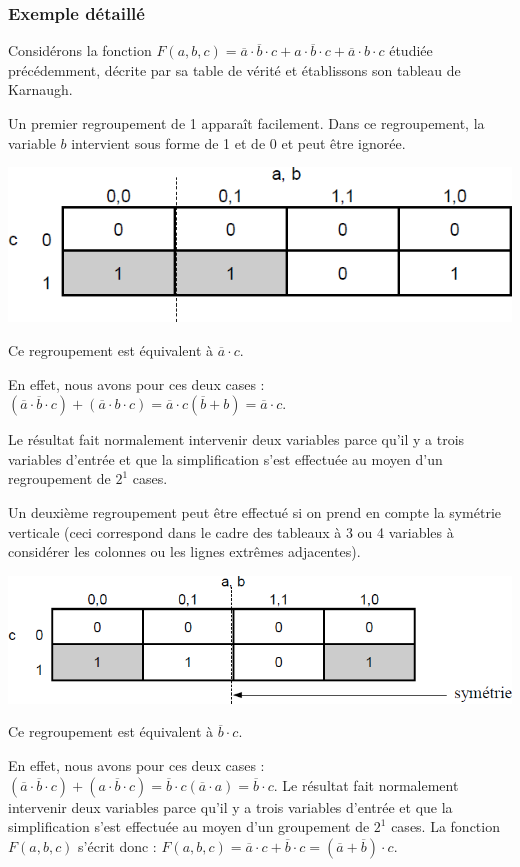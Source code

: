 \documentclass[11pt,oneside]{article}
\begin{document}
\subsubsection{Exemple détaillé}
Considérons la fonction $F(a,b,c) = \overline{a}\cdot \overline{b}\cdot c + a \cdot \overline{b} \cdot c + \overline{a} \cdot b \cdot c$ étudiée précédemment, décrite par sa table de vérité et établissons son tableau de Karnaugh. 

Un premier regroupement de 1 apparaît facilement. Dans ce regroupement, la variable $b$ intervient sous forme de 1 et de 0 et peut être ignorée. 

\begin{center}
\includegraphics[width=.6\textwidth]{png/fig_14}
\end{center}

Ce regroupement est équivalent à $\overline{a}\cdot c$. 

En effet, nous avons pour ces deux cases : $(\overline{a}\cdot\overline{b}\cdot c)+(\overline{a}\cdot b \cdot c)= \overline{a}\cdot c (\overline{b}+b)=\overline{a}\cdot c$.

Le résultat fait normalement intervenir deux variables parce qu'il y a trois variables d'entrée et que la simplification s'est effectuée au moyen d'un regroupement de $2^1$ cases. 

Un deuxième regroupement peut être effectué si on prend en compte la symétrie verticale (ceci correspond dans le cadre des tableaux à 3 ou 4 variables à considérer les colonnes ou les lignes extrêmes adjacentes).

\begin{center}
\includegraphics[width=.6\textwidth]{png/fig_15}
\end{center}

Ce regroupement est équivalent à $\overline{b}\cdot c $.

En effet, nous avons pour ces deux cases : $(\overline{a}\cdot \overline{b}\cdot c)+(a\cdot \overline{b}\cdot c)=\overline{b}\cdot c(\overline{a}\cdot a) = \overline{b}\cdot c$. Le résultat fait normalement intervenir deux variables parce qu'il y a trois variables d'entrée et que la simplification s'est effectuée au moyen d'un groupement de $2^1$ cases. La fonction $F(a,b,c)$ s'écrit donc : $F(a,b,c)=\overline{a}\cdot c + \overline{b}\cdot c =(\overline{a} + \overline{b}) \cdot c$.
\end{document}
